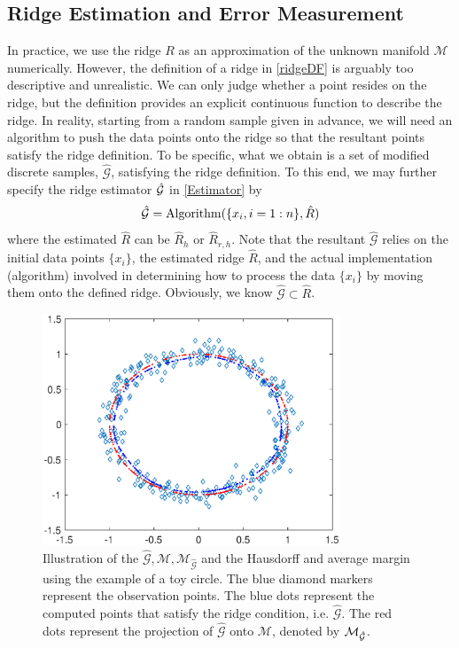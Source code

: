 \documentclass[aos,preprint]{imsart}
\theoremstyle{remark}
\begin{document}
\subsection{Ridge Estimation and Error Measurement}
In practice, we use the ridge $R$ as an approximation of the unknown manifold $\mathcal M$ numerically. However, the definition of a ridge in \eqref{ridgeDF} is arguably too descriptive and unrealistic. We can only judge whether a point resides on the ridge, but the definition provides an explicit continuous function to describe the ridge. In reality, starting from a random sample given in advance, we will need an algorithm to push the data points onto the ridge so that the resultant points satisfy the ridge definition. To be specific, what we obtain is a set of modified discrete samples, $\hat{\mathcal G}$, satisfying the ridge definition. To this end, we may further specify the ridge estimator $\hat{\cal G}$ in \eqref{Estimator} by
\[
\hat{\mathcal G} = {\rm Algorithm}(\{x_i, i=1:n\},  \hat{R})
\]
where the estimated $\hat{R}$ can be $\hat{R}_h$ or $\hat{R}_{r,h}$. Note that the resultant $\hat{\mathcal G}$ relies on the initial data points $\{x_i\}$, the estimated ridge $\hat{R}$, and the actual implementation (algorithm) involved in determining how to process the data $\{x_i\}$ by moving them onto the defined ridge. Obviously, we know $\hat{\mathcal G} \subset \hat{R}$.
\begin{figure}[htbp] %
   \centering
   \includegraphics[width=3.5in]{introduction_demo.eps} 
      \caption{Illustration of the $\hat{\mathcal G},\mathcal M, \mathcal M_{\hat{\mathcal G}}$ and the Hausdorff and average margin using the example of a toy circle. The blue diamond markers represent the observation points. The blue dots represent the computed points that satisfy the ridge condition, i.e. $\hat{\mathcal G}$. The red dots represent the projection of $\hat{\mathcal G}$ onto $\mathcal M$, denoted by $\cal M_{\hat{G}}$. }
   \label{fig:example:2}
\end{figure}
\end{document}
